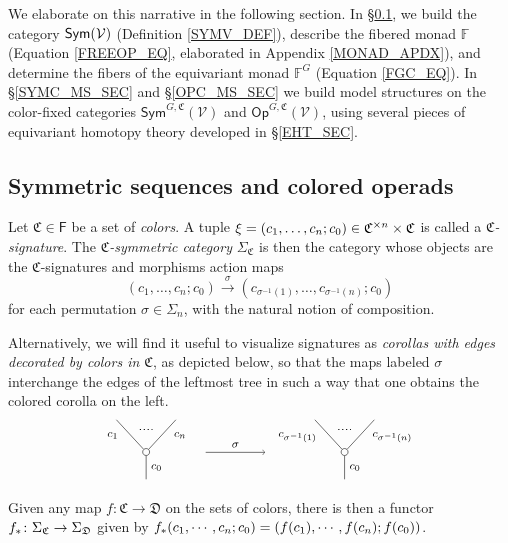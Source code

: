 \documentclass[a4paper,10pt
,draft
]{article}%
\renewcommand{\1}{\eta}%
\begin{document}
We elaborate on this narrative in the following section.
In \S \ref{SYMC_SEC}, we build the category $\mathsf{Sym}(\mathcal V)$ (Definition \ref{SYMV_DEF}),
describe the fibered monad $\mathbb F$ (Equation \eqref{FREEOP_EQ}, elaborated in Appendix \ref{MONAD_APDX}),
and determine the fibers of the equivariant monad $\mathbb F^G$ (Equation \eqref{FGC_EQ}).
In \S \ref{SYMC_MS_SEC} and \S \ref{OPC_MS_SEC} we build model structures on the color-fixed categories $\mathsf{Sym}^{G,\mathfrak{C}}(\mathcal{V})$ and $\mathsf{Op}^{G,\mathfrak{C}}(\mathcal{V})$,
using several pieces of equivariant homotopy theory developed in \S \ref{EHT_SEC}.





\subsection{Symmetric sequences and colored operads}
\label{SYMC_SEC}

\begin{definition}\label{CSYM DEF}
	Let $\mathfrak {C} \in \mathsf{F}$ be a set of \textit{colors}.
	A tuple
	$\xi = (c_1, \ldots, c_n; c_0) \in \mathfrak C^{\times n} \times \mathfrak C$
	is called a \textit{$\mathfrak {C}$-signature}.
	The \textit{$\mathfrak C$-symmetric category} $\Sigma_{\mathfrak C}$ is then the category whose objects are the $\mathfrak{C}$-signatures and morphisms action maps
\[
(c_1, \ldots, c_n; c_0) \xrightarrow{\sigma} (c_{\sigma^{-1}(1)}, \ldots, c_{\sigma^{-1}(n)}; c_0)
\]
	for each permutation $\sigma \in \Sigma_n$, with the natural notion of composition.

Alternatively, we will find it useful to visualize signatures as \textit{corollas with edges decorated by colors in $\mathfrak{C}$}, as depicted below, so that the maps labeled $\sigma$ interchange the edges of the leftmost tree in such a way that one obtains the colored corolla on the left.
\[
\begin{tikzpicture}
      [grow=up,auto,level distance=2.3em,every node/.style = {font=\footnotesize},dummy/.style={circle,draw,inner sep=0pt,minimum size=1.75mm}]
      
      \node at (0,0) [font=\normalsize]{}
		child{node [dummy] {}
			child{
			edge from parent node [swap,near end] {$c_n$} node [name=Kn] {}}
			child{
			edge from parent node [near end] {$c_1$}
node [name=Kone,swap] {}}
		edge from parent node [swap] {$c_0$}
		};
		\draw [dotted,thick] (Kone) -- (Kn) ;
	\node at (5,0) [font=\normalsize]{}
		child{node [dummy] {}
			child{
			edge from parent node [swap,near end] {$c_{\sigma^{-1}(n)}$} node [name=Kn] {}}
			child{
			edge from parent node [near end] {$c_{\sigma^{-1}(1)}$}
node [name=Kone,swap] {}}
		edge from parent node [swap] {$c_0$}
		};
		\draw [dotted,thick] (Kone) -- (Kn) ;

\draw[->] (1.5,0.8) -- node{$\sigma$} (3,0.8);
\end{tikzpicture}
\]
Given any map $f \colon \mathfrak{C} \to \mathfrak{D}$ on the sets of colors, there is then a functor
$f_{\**} \colon \Sigma_{\mathfrak{C}} \to \Sigma_{\mathfrak{D}}$
given by $f_{\**} (c_1,\cdots,c_n;c_0) = (f(c_1),\cdots,f(c_n);f(c_0))$. 
\end{definition}
\end{document}
